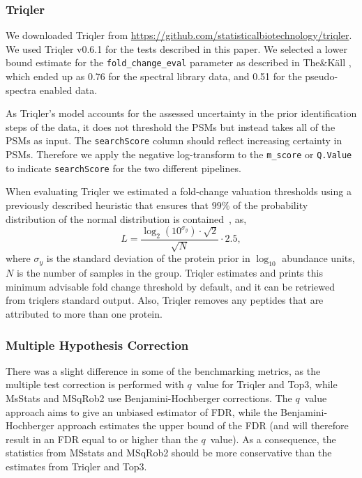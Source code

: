 \documentclass[10pt,letterpaper]{article}
\begin{document}
\subsubsection*{Triqler}

We downloaded Triqler from \url{https://github.com/statisticalbiotechnology/triqler}. We used Triqler v0.6.1 for the tests described in this paper. We selected a lower bound estimate for the \texttt{fold\_change\_eval} parameter as described in The\&K\"{a}ll \cite{the2021triqler}, which ended up as 0.76 for the spectral library data, and 0.51 for the pseudo-spectra enabled data.

As Triqler's model accounts for the assessed uncertainty in the prior identification steps of the data, it does not threshold the PSMs but instead takes all of the PSMs as input. The \texttt{searchScore} column should reflect increasing certainty in PSMs. Therefore we apply the negative log-transform to the \texttt{m\_score} or \texttt{Q.Value} to indicate \texttt{searchScore} for the two different pipelines. 

When evaluating Triqler we estimated a fold-change valuation thresholds using a previously described heuristic that ensures that $99\%$ of the 
probability distribution of the normal distribution is contained~\cite{the2021triqler}, as,
\begin{equation}
 L = \frac{\log_2 \left( 10^{\sigma_y} \right) \cdot \sqrt{2}}{\sqrt{N}} \cdot 
2.5,
\end{equation}
where $\sigma_y$ is the standard deviation of the protein prior in $\log_{10}$ 
abundance units, $N$ is the number of samples in the group. Triqler estimates and prints this minimum advisable fold change threshold by default, and it can be retriewed from triqlers standard output.
Also, Triqler removes any peptides that are attributed to more than one protein.

\subsubsection*{Multiple Hypothesis Correction}

There was a slight difference in some of the benchmarking metrics, as the multiple test correction is performed with $q$~value for Triqler and Top3, while MsStats and MSqRob2 use Benjamini-Hochberger \cite{benjamini1995controlling} corrections. The $q$~value approach aims to give an unbiased estimator of FDR, while the Benjamini-Hochberger approach estimates the upper bound of the FDR (and will therefore result in an FDR equal to or higher than the $q$~value). As a consequence, the statistics from MSstats and MSqRob2 should be more conservative than the estimates from Triqler and Top3\cite{korthauer2019practical}.
\end{document}
